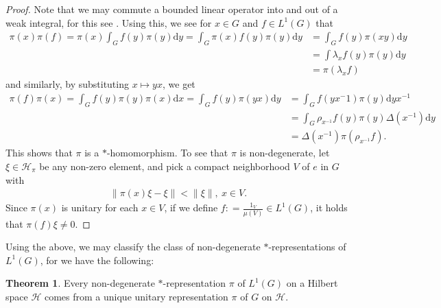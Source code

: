 \documentclass[10pt,twoside,openany,final]{memoir}
\theoremstyle{definition}
\newtheorem{theorem}{Theorem}[chapter]
\theoremstyle{Break}
\newcommand{\lv}{\left\lVert}
\newcommand{\rv}{\right\rVert}
\renewcommand{\H}{\mathcal{H}}
\renewcommand{\d}{\mathrm{d}}
\begin{document}
\begin{proof}
Note that we may commute a bounded linear operator into and out of a weak integral, for this see . Using this, we see for $x \in G$ and $f \in L^1(G)$ that
\begin{align*}
	\pi(x) \pi(f) = \pi(x) \int_G f(y)\pi(y) \d y =\int_G \pi(x) f(y) \pi(y) \d y &= \int_G f(y) \pi(xy) \d y \\
	&= \int \lambda_x f(y) \pi(y) \d y \\
	&= \pi(\lambda_x f)
\end{align*}
and similarly, by substituting $x \mapsto yx$, we get
\begin{align*}
	\pi(f) \pi(x) = \int_G f(y) \pi(y) \pi(x) \d x = \int_G f(y) \pi(yx) \d y & = \int_G f(yx^ -1)\pi(y) \d yx^{-1}\\
	&= \int_G \rho_{x^{-1}}f(y) \pi(y) \Delta(x^{-1}) \d y\\
	&= \Delta(x^{-1}) \pi\left( \rho_{x^{-1}}f \right).
\end{align*}
This shows that $\pi$ is a $*$-homomorphism. To see that $\pi$ is non-degenerate, let $\xi \in \H_\pi$ be any non-zero element, and pick a compact neighborhood $V$ of $e$ in $G$ with
\begin{align*}
	\lv \pi(x) \xi - \xi \rv < \lv \xi \rv, \ x \in V.
\end{align*}
Since $\pi(x)$ is unitary for each $x \in V$, if we define $f: = \frac{1_{V}}{\mu(V)} \in L^1(G)$, it holds that $\pi(f)\xi \neq 0$.
\end{proof}
Using the above, we may classify the class of non-degenerate $*$-representations of $L^1(G)$, for we have the following:
\begin{theorem}
	Every non-degenerate $*$-representation $\pi$ of $L^1(G)$ on a Hilbert space $\H$ comes from a unique unitary representation $\pi$ of $G$ on $\H$.
	\label{3.11}
\end{theorem}
\end{document}

